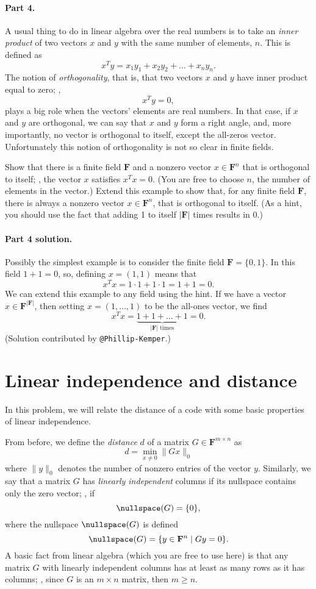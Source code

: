 \documentclass[12pt,hidelinks]{article}
\newcommand{\field}{\mathbf{F}}
\begin{document}
\paragraph{Part 4.} A usual thing to do in linear algebra over the real
numbers is to take an \emph{inner product} of two vectors $x$ and $y$ with
the same number of elements, $n$. This is defined as
\[
    x^Ty = x_1y_1 + x_2y_2 + \dots + x_ny_n.
\]
The notion of \emph{orthogonality}, that is, that two vectors $x$ and $y$ have
inner product equal to zero; \ie,
\[
    x^Ty = 0,
\]
plays a big role when the vectors' elements are real numbers. In that case, if
$x$ and $y$ are orthogonal, we can say that $x$ and $y$ form a right angle,
and, more importantly, no vector is orthogonal to itself, except the all-zeros
vector. Unfortunately this notion of orthogonality is not so clear in finite
fields.

Show that there is a finite field $\field$ and a nonzero vector $x \in
\field^n$ that is orthogonal to itself; \ie, the vector $x$ satisfies $x^Tx =
0$. (You are free to choose $n$, the number of elements in the vector.) Extend
this example to show that, for any finite field $\field$, there is always a
nonzero vector $x \in \field^n$, that is orthogonal to itself. (As a hint, you
should use the fact that adding 1 to itself $|\field|$ times results in 0.)

\begin{solution}
\paragraph{Part 4 solution.} Possibly the simplest example is to consider
the finite field $\field = \{0, 1\}$. In this field $1 + 1 = 0$, so, defining
$x = (1,1)$ means that
\[
    x^Tx = 1\cdot 1 + 1\cdot1 = 1+1 = 0.
\]
We can extend this example to any field using the hint. If we have a vector
$x \in \field^{|\field|}$, then setting $x = (1, \dots, 1)$ to be the all-ones
vector, we find
\[
    x^Tx = \underbrace{1 + 1 + \dots + 1}_\text{$|\field|$ times} = 0.
\]
(Solution contributed by \verb|@Phillip-Kemper|.)
\end{solution}

\section{Linear independence and distance}
In this problem, we will relate the distance of a code with some basic
properties of linear independence.

From before, we define the \emph{distance} $d$ of a matrix $G \in \field^{m\times n}$
as
\[
    d = \min_{x \ne 0} \|Gx\|_0
\]
where $\|y\|_0$ denotes the number of nonzero entries of the vector $y$.
Similarly, we say that a matrix $G$ has \emph{linearly independent} columns if
its nullspace contains only the zero vector; \ie, if
\[
    \nullspace(G) = \{0\},
\]
where the nullspace $\nullspace(G)$ is defined
\[
    \nullspace(G) = \{y \in \field^n \mid Gy = 0\}.
\]
A basic fact from linear algebra (which you are free to use here) is that any
matrix $G$ with linearly independent columns has at least as many rows as it
has columns; \ie, since $G$ is an $m\times n$ matrix, then $m \ge n$.
\end{document}
